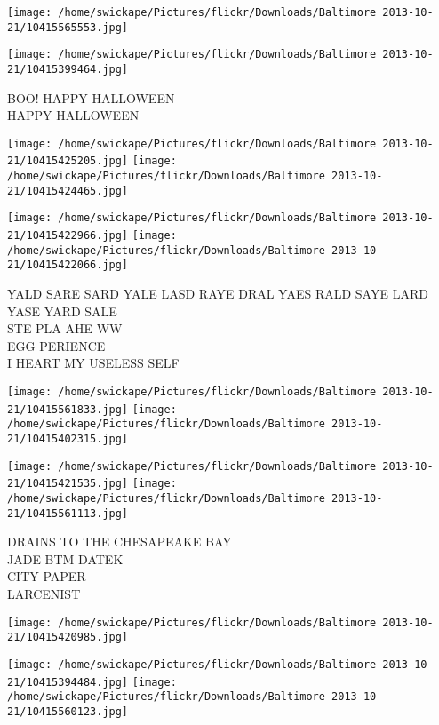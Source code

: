 \documentclass[10pt,letterpaper]{article}
\begin{document}
\texttt{[image: /home/swickape/Pictures/flickr/Downloads/Baltimore 2013-10-21/10415565553.jpg]}

\vspace{0.25in}
\texttt{[image: /home/swickape/Pictures/flickr/Downloads/Baltimore 2013-10-21/10415399464.jpg]}

BOO! HAPPY HALLOWEEN\\
HAPPY HALLOWEEN\\
\pagebreak

\texttt{[image: /home/swickape/Pictures/flickr/Downloads/Baltimore 2013-10-21/10415425205.jpg]}
\texttt{[image: /home/swickape/Pictures/flickr/Downloads/Baltimore 2013-10-21/10415424465.jpg]}

\texttt{[image: /home/swickape/Pictures/flickr/Downloads/Baltimore 2013-10-21/10415422966.jpg]}
\texttt{[image: /home/swickape/Pictures/flickr/Downloads/Baltimore 2013-10-21/10415422066.jpg]}

YALD SARE SARD YALE LASD RAYE DRAL YAES RALD SAYE LARD YASE YARD SALE\\
STE PLA AHE WW\\
EGG PERIENCE\\
I HEART MY USELESS SELF\\
\pagebreak

\texttt{[image: /home/swickape/Pictures/flickr/Downloads/Baltimore 2013-10-21/10415561833.jpg]}
\texttt{[image: /home/swickape/Pictures/flickr/Downloads/Baltimore 2013-10-21/10415402315.jpg]}

\texttt{[image: /home/swickape/Pictures/flickr/Downloads/Baltimore 2013-10-21/10415421535.jpg]}
\texttt{[image: /home/swickape/Pictures/flickr/Downloads/Baltimore 2013-10-21/10415561113.jpg]}

DRAINS TO THE CHESAPEAKE BAY\\
JADE BTM DATEK\\
CITY PAPER\\
LARCENIST\\
\pagebreak

\texttt{[image: /home/swickape/Pictures/flickr/Downloads/Baltimore 2013-10-21/10415420985.jpg]}

\vspace{0.25in}
\texttt{[image: /home/swickape/Pictures/flickr/Downloads/Baltimore 2013-10-21/10415394484.jpg]}
\texttt{[image: /home/swickape/Pictures/flickr/Downloads/Baltimore 2013-10-21/10415560123.jpg]}
\end{document}

